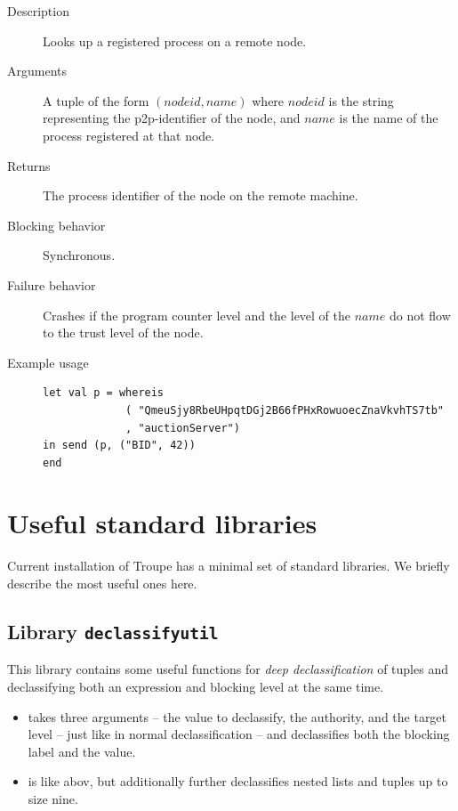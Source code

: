 \begin{description}
    \item [Description] Looks up a registered process on a remote node.
    \item [Arguments] A tuple of the form $(\mathit{nodeid}, \mathit{name})$ where $\mathit{nodeid}$ is the string representing the p2p-identifier of the node, and $\mathit{name}$ is the name of the process registered at that node.
    \item [Returns] The process identifier of the node on the remote machine. 
    \item [Blocking behavior] Synchronous. 
    \item [Failure behavior] Crashes if the program counter level and the level of the $\mathit{name}$ do not flow to the trust level of the node.
    \item [Example usage]
\begin{minipage}[t]{30em}
\begin{verbatim}
let val p = whereis 
             ( "QmeuSjy8RbeUHpqtDGj2B66fPHxRowuoecZnaVkvhTS7tb"
             , "auctionServer")
in send (p, ("BID", 42))
end
\end{verbatim}    
\end{minipage}
\end{description}

\section{Useful standard libraries}

Current installation of Troupe has a minimal set of standard libraries. We briefly describe the 
most useful ones here.

\subsection{Library {\tt declassifyutil}} 

This library contains some useful functions for \emph{deep declassification} of tuples and 
declassifying both an expression and blocking level at the same time. 

\begin{itemize}
\item {} takes three arguments -- the value to declassify, 
the authority, and the target level -- just like in normal declassification -- and declassifies
both the blocking label and the value. 


\item {} is like abov, but additionally
further declassifies nested lists and tuples up to size nine. 


\end{itemize}

